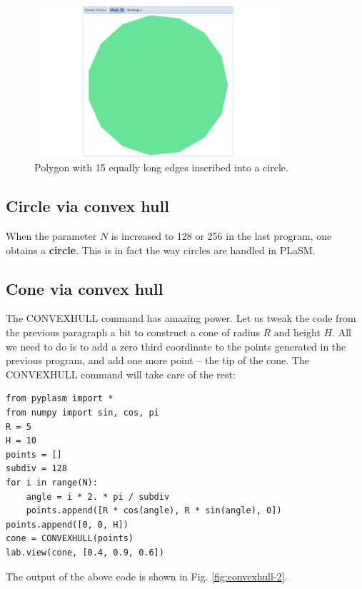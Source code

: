 \documentclass[article,A4,12pt]{llncs}
\begin{document}
\begin{figure}[!ht]
\begin{center}
\includegraphics[width=0.82\textwidth]{img/convexhull-1.png}
\end{center}
\vspace{-2mm}
\caption{Polygon with 15 equally long edges inscribed into a circle.}
\label{fig:convexhull-1}
\end{figure}

\subsection{Circle via convex hull}

When the parameter $N$ is increased to 128 or 256 in the last program, 
one obtains a {\bf circle}. This is in fact the way circles are handled in PLaSM.
 

\subsection{Cone via convex hull}

The CONVEXHULL command has amazing power. Let us tweak the code
from the previous paragraph a bit to construct a cone of radius
$R$ and height $H$. All we need to do is to add a zero third coordinate 
to the points generated in the previous program, and add one more 
point -- the tip of the cone. The CONVEXHULL command will take care 
of the rest:

{\small
\begin{verbatim}
from pyplasm import *
from numpy import sin, cos, pi
R = 5
H = 10
points = []
subdiv = 128
for i in range(N):
    angle = i * 2. * pi / subdiv
    points.append([R * cos(angle), R * sin(angle), 0])
points.append([0, 0, H])
cone = CONVEXHULL(points)
lab.view(cone, [0.4, 0.9, 0.6])
\end{verbatim}
}
\noindent
The output of the above code is shown in Fig. \ref{fig:convexhull-2}.
\end{document}
